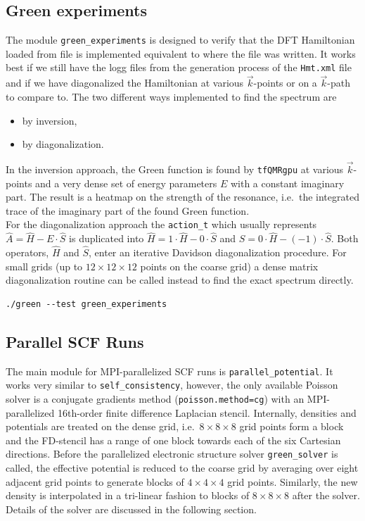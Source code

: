 \documentclass[oribibl]{llncs}
\newcommand{\ttt}[1]{\texttt{#1}}
\begin{document}
\subsection{Green experiments} \label{sec:green-experiments}
The module \ttt{green\_experiments} is designed to verify that the \ac{DFT} Hamiltonian loaded from file
is implemented equivalent to where the file was written.
It works best if we still have the logg files from the generation process of the \ttt{Hmt.xml} file 
and if we have diagonalized the Hamiltonian at various $\vec{k}$-points or on a $\vec{k}$-path to compare to.
The two different ways implemented to find the spectrum are
\begin{itemize}
  \item by inversion,
  \item by diagonalization.
\end{itemize}
In the inversion approach, the Green function is found by \ttt{tfQMRgpu} at various $\vec{k}$-points
and a very dense set of energy parameters $E$ with a constant imaginary part.
The result is a heatmap on the strength of the resonance, 
i.e.~the integrated trace of the imaginary part of the found Green function.\\
For the diagonalization approach the \ttt{action\_t} which usually represents $\hat A = \hat H - E\cdot \hat S$ is duplicated into $\hat H = 1\cdot \hat H - 0\cdot\hat S$ and $\hat S = 0\cdot \hat H - (-1)\cdot\hat S$.
Both operators, $\hat H$ and $\hat S$, enter an iterative Davidson diagonalization procedure. For small grids (up to $12 \times 12 \times 12$ points on the coarse grid) a dense matrix diagonalization routine can be called instead to find the exact spectrum directly.
\begin{verbatim}
./green --test green_experiments
\end{verbatim}

\subsection{Parallel SCF Runs}
The main module for \ac{MPI}-parallelized \ac{SCF} runs is \ttt{parallel\_potential}.
It works very similar to \ttt{self\_consistency}, however, the only available Poisson solver
is a conjugate gradients method (\ttt{poisson.method=cg}) with an \ac{MPI}-parallelized 16th-order finite difference Laplacian stencil.
Internally, densities and potentials are treated on the dense grid, i.e.~$8 \times 8 \times 8$ grid points form a block and the FD-stencil has a range of one block towards each of the six Cartesian directions.
Before the parallelized electronic structure solver \ttt{green\_solver} is called, the effective potential is
reduced to the coarse grid by averaging over eight adjacent grid points to generate blocks of $4 \times 4 \times 4$ grid points. Similarly, the new density is interpolated in a tri-linear fashion to blocks of $8 \times 8 \times 8$ after the solver. Details of the solver are discussed in the following section.
\end{document}
